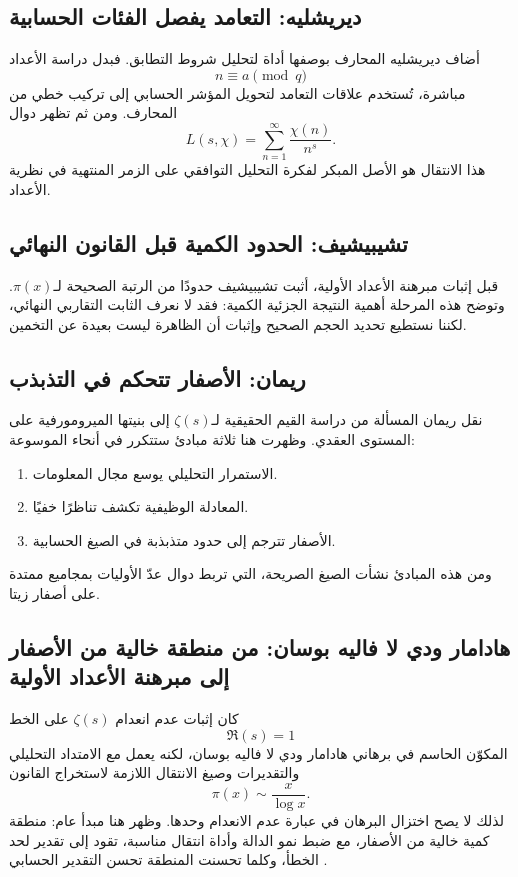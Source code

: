 \subsection{ديريشليه: التعامد يفصل الفئات الحسابية}

أضاف ديريشليه المحارف بوصفها أداة لتحليل شروط التطابق. فبدل دراسة الأعداد
\[
n\equiv a\pmod q
\]
مباشرة، تُستخدم علاقات التعامد لتحويل المؤشر الحسابي إلى تركيب خطي من المحارف. ومن ثم تظهر دوال
\[
L(s,\chi)=\sum_{n=1}^{\infty}\frac{\chi(n)}{n^s}.
\]
هذا الانتقال هو الأصل المبكر لفكرة التحليل التوافقي على الزمر المنتهية في نظرية الأعداد.

\subsection{تشيبيشيف: الحدود الكمية قبل القانون النهائي}

قبل إثبات مبرهنة الأعداد الأولية، أثبت تشيبيشيف حدودًا من الرتبة الصحيحة لـ\(\pi(x)\). وتوضح هذه المرحلة أهمية النتيجة الجزئية الكمية: فقد لا نعرف الثابت التقاربي النهائي، لكننا نستطيع تحديد الحجم الصحيح وإثبات أن الظاهرة ليست بعيدة عن التخمين.

\subsection{ريمان: الأصفار تتحكم في التذبذب}

نقل ريمان المسألة من دراسة القيم الحقيقية لـ\(\zeta(s)\) إلى بنيتها الميرومورفية على المستوى العقدي. وظهرت هنا ثلاثة مبادئ ستتكرر في أنحاء الموسوعة:

\begin{enumerate}
  \item الاستمرار التحليلي يوسع مجال المعلومات.
  \item المعادلة الوظيفية تكشف تناظرًا خفيًا.
  \item الأصفار تترجم إلى حدود متذبذبة في الصيغ الحسابية.
\end{enumerate}

ومن هذه المبادئ نشأت الصيغ الصريحة، التي تربط دوال عدّ الأوليات بمجاميع ممتدة على أصفار زيتا.

\subsection{هادامار ودي لا فاليه بوسان: من منطقة خالية من الأصفار إلى مبرهنة الأعداد الأولية}

كان إثبات عدم انعدام \(\zeta(s)\) على الخط
\[
\Re(s)=1
\]
المكوّن الحاسم في برهاني هادامار ودي لا فاليه بوسان، لكنه يعمل مع
الامتداد التحليلي والتقديرات وصيغ الانتقال اللازمة لاستخراج القانون
\[
\pi(x)\sim \frac{x}{\log x}.
\]
لذلك لا يصح اختزال البرهان في عبارة عدم الانعدام وحدها. وظهر هنا مبدأ
عام: منطقة كمية خالية من الأصفار، مع ضبط نمو الدالة وأداة انتقال مناسبة،
تقود إلى تقدير لحد الخطأ، وكلما تحسنت المنطقة تحسن التقدير الحسابي
\cite{Narkiewicz2000,Davenport2000,Newman1980}.


